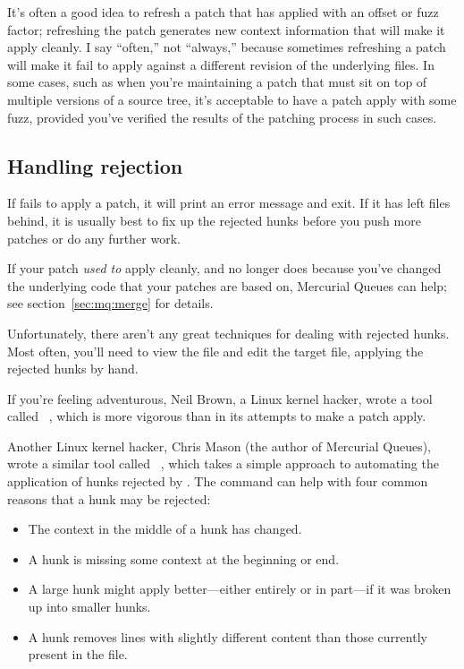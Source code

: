 It's often a good idea to refresh a patch that has applied with an
offset or fuzz factor; refreshing the patch generates new context
information that will make it apply cleanly.  I say ``often,'' not
``always,'' because sometimes refreshing a patch will make it fail to
apply against a different revision of the underlying files.  In some
cases, such as when you're maintaining a patch that must sit on top of
multiple versions of a source tree, it's acceptable to have a patch
apply with some fuzz, provided you've verified the results of the
patching process in such cases.

\subsection{Handling rejection}

If  fails to apply a patch, it will print an error
message and exit.  If it has left  files behind, it is
usually best to fix up the rejected hunks before you push more patches
or do any further work.

If your patch \emph{used to} apply cleanly, and no longer does because
you've changed the underlying code that your patches are based on,
Mercurial Queues can help; see section~\ref{sec:mq:merge} for details.

Unfortunately, there aren't any great techniques for dealing with
rejected hunks.  Most often, you'll need to view the 
file and edit the target file, applying the rejected hunks by hand.

If you're feeling adventurous, Neil Brown, a Linux kernel hacker,
wrote a tool called ~\cite{web:wiggle}, which is more
vigorous than  in its attempts to make a patch apply.

Another Linux kernel hacker, Chris Mason (the author of Mercurial
Queues), wrote a similar tool called
~\cite{web:mpatch}, which takes a simple approach to
automating the application of hunks rejected by .  The
 command can help with four common reasons that a hunk
may be rejected:

\begin{itemize}
\item The context in the middle of a hunk has changed.
\item A hunk is missing some context at the beginning or end.
\item A large hunk might apply better---either entirely or in
  part---if it was broken up into smaller hunks.
\item A hunk removes lines with slightly different content than those
  currently present in the file.
\end{itemize}


